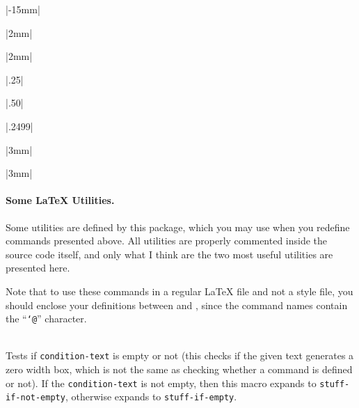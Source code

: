 \documentclass[11pt,a4paper]{article}
\begin{document}
\pkgdefdefault|-15mm|

\pkgdefdefault|2mm|

\pkgdefdefault|2mm|

\pkgdefdefault|.25\textwidth|

\pkgdefdefault|.50\textwidth|

\pkgdefdefault|.2499\textwidth|

\pkgdefdefault|3mm|

\pkgdefdefault|3mm|




\paragraph{Some \LaTeX{} Utilities.} Some utilities are defined by this package,
which you may use when you redefine commands presented above.
All utilities are properly commented inside the source code itself, and only what I think
are the two most useful utilities are presented here.

Note that to use these
commands in a regular \LaTeX{} file and not a style file, you should enclose your
definitions between  and , since the command
names contain the ``\texttt{\char`@}'' character.

{\\Tests if \texttt{condition-text} is empty or not (this checks if the given text
  generates a 
  zero width box, which is not the same as checking whether a command is defined or
  not). If the \texttt{condition-text} is not empty, then this macro expands to
  \texttt{stuff-if-not-empty}, otherwise expands to \texttt{stuff-if-empty}.
}


\end{document}
